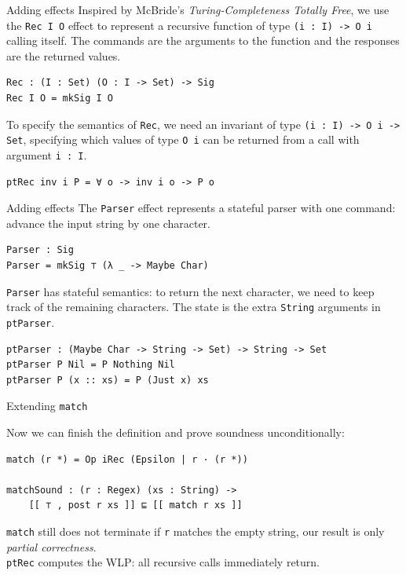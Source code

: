 \documentclass[ignorenonframetext,]{beamer}
\newcommand{\Agda}[1]{\texttt{#1}\xspace}
\newcommand{\match}{\Agda{match}}
\begin{document}
\begin{frame}[fragile]{Adding effects}
Inspired by McBride's \textit{Turing-Completeness Totally Free}, we use the \Agda{Rec I O} effect to represent a recursive function of type \Agda{(i : I) -> O i} calling itself.
The commands are the arguments to the function and the responses are the returned values.
\begin{verbatim}
Rec : (I : Set) (O : I -> Set) -> Sig
Rec I O = mkSig I O
\end{verbatim}
To specify the semantics of \Agda{Rec}, we need an invariant of type \Agda{(i : I) -> O i -> Set},
specifying which values of type \Agda{O i} can be returned from a call with argument \Agda{i : I}.
\begin{verbatim}
ptRec inv i P = ∀ o -> inv i o -> P o
\end{verbatim}
\end{frame}

\begin{frame}[fragile]{Adding effects}
The \Agda{Parser} effect represents a stateful parser with one command:
advance the input string by one character.

\begin{verbatim}
Parser : Sig
Parser = mkSig ⊤ (λ _ -> Maybe Char)
\end{verbatim}

\Agda{Parser} has stateful semantics: to return the next character, we need to keep track of the remaining characters.
The state is the extra \Agda{String} arguments in \Agda{ptParser}.
\begin{verbatim}
ptParser : (Maybe Char -> String -> Set) -> String -> Set
ptParser P Nil = P Nothing Nil
ptParser P (x :: xs) = P (Just x) xs
\end{verbatim}

\end{frame}

\begin{frame}[fragile]{Extending \match}

Now we can finish the definition and prove soundness unconditionally:
\begin{verbatim}
match (r *) = Op iRec (Epsilon | r · (r *))

matchSound : (r : Regex) (xs : String) ->
    [[ ⊤ , post r xs ]] ⊑ [[ match r xs ]]
\end{verbatim}

\pause
\match still does not terminate if \Agda{r} matches the empty string, our result is only \emph{partial correctness}.\\
\Agda{ptRec} computes the WLP: all recursive calls immediately return.
\end{frame}
\end{document}
